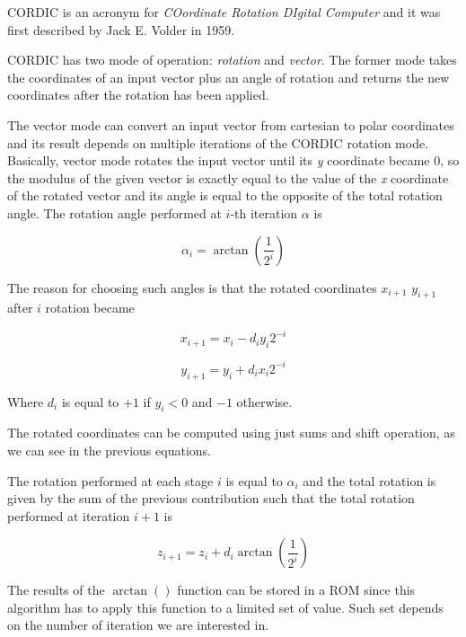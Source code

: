 \documentclass[12pt,a4paper]{report}
\begin{document}
CORDIC is an acronym for \emph{COordinate Rotation DIgital Computer} and it was first described by Jack E. Volder in 1959.

CORDIC has two mode of operation: \emph{rotation} and \emph{vector}. The former mode takes the coordinates of an input vector plus an angle of rotation and returns the new coordinates after the rotation has been applied.

The vector mode can convert an input vector from cartesian to polar coordinates and its result depends on multiple iterations of the CORDIC rotation mode. Basically, vector mode rotates the input vector until its \emph{y} coordinate became 0, so the modulus of the given vector is exactly equal to the value of the \emph{x} coordinate of the rotated vector and its angle is equal to the opposite of the total rotation angle.\newline
The rotation angle performed at $i$-th iteration $\alpha$ is

\begin{equation}
\alpha_{i} = \arctan \left(\dfrac{1}{2^i}\right)
\end{equation}

The reason for choosing such angles is that the rotated coordinates $x_{i+1}$ $y_{i+1}$  after $i$ rotation became

\begin{equation}
x_{i+1} = x_{i} - d_{i} y_{i}  2^{-i}
\end{equation}

\begin{equation}
y_{i+1} = y_{i} + d_{i} x_{i} 2^{-i}
\end{equation}

Where $d_{i}$ is equal to $+1$ if $y_{i} < 0$ and $-1$ otherwise.

The rotated coordinates can be computed using just sums and shift operation, as we can see in the previous equations.

The rotation performed at each stage $i$ is equal to $\alpha_{i}$ and the total rotation is given by the sum of the previous contribution such that the total rotation performed at iteration $i+1$ is

\begin{equation}
z_{i+1} = z_{i} + d_{i} \arctan \left(\dfrac{1}{2^i}\right)
\end{equation}


The results of the $\arctan()$ function can be stored in a ROM since this algorithm has to apply this function to a limited set of value. Such set depends on the number of iteration we are interested in.
\end{document}
